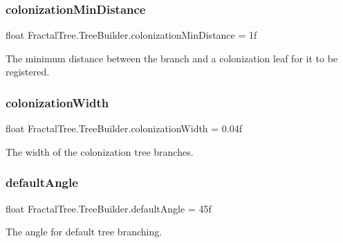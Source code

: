 \subsubsection{\texorpdfstring{colonization\+Min\+Distance}{colonizationMinDistance}}
{\footnotesize\ttfamily float Fractal\+Tree.\+Tree\+Builder.\+colonization\+Min\+Distance = 1f}



The minimum distance between the branch and a colonization leaf for it to be registered. 

\hypertarget{class_fractal_tree_1_1_tree_builder_a22b8c477430d16faa020d724c8573a57}{}\label{class_fractal_tree_1_1_tree_builder_a22b8c477430d16faa020d724c8573a57} 
\subsubsection{\texorpdfstring{colonization\+Width}{colonizationWidth}}
{\footnotesize\ttfamily float Fractal\+Tree.\+Tree\+Builder.\+colonization\+Width = 0.\+04f}



The width of the colonization tree branches. 

\hypertarget{class_fractal_tree_1_1_tree_builder_a71036891662e482caeb410dadd5bfe65}{}\label{class_fractal_tree_1_1_tree_builder_a71036891662e482caeb410dadd5bfe65} 
\subsubsection{\texorpdfstring{default\+Angle}{defaultAngle}}
{\footnotesize\ttfamily float Fractal\+Tree.\+Tree\+Builder.\+default\+Angle = 45f}



The angle for default tree branching. 

\hypertarget{class_fractal_tree_1_1_tree_builder_a6f7229c6652a8d52f4227f5e7dce3123}{}\label{class_fractal_tree_1_1_tree_builder_a6f7229c6652a8d52f4227f5e7dce3123} 
